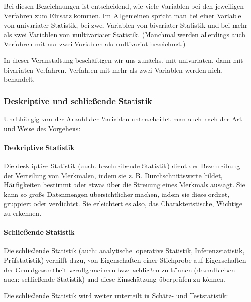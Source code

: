 \documentclass[
  11pt,
  ngerman,
  a4paper,
]{report}
\begin{document}
Bei diesen Bezeichnungen ist entscheidend, wie viele Variablen bei den jeweiligen Verfahren zum Einsatz kommen. Im Allgemeinen spricht man bei einer Variable von univariater Statistik, bei zwei Variablen von bivariater Statistik und bei mehr als zwei Variablen von multivariater Statistik. (Manchmal werden allerdings auch Verfahren mit nur zwei Variablen als multivariat bezeichnet.)

In dieser Veranstaltung beschäftigen wir uns zunächst mit univariaten, dann mit bivariaten Verfahren. Verfahren mit mehr als zwei Variablen werden nicht behandelt.

\hypertarget{deskriptive-und-schlieuxdfende-statistik}{%
\subsubsection{Deskriptive und schließende Statistik}\label{deskriptive-und-schlieuxdfende-statistik}}

Unabhängig von der Anzahl der Variablen unterscheidet man auch nach der Art und Weise des Vorgehens:

\hypertarget{deskriptive-statistik}{%
\paragraph{Deskriptive Statistik}\label{deskriptive-statistik}}

Die deskriptive Statistik (auch: beschreibende Statistik) dient der Beschreibung der Verteilung von Merkmalen, indem sie z. B. Durchschnittswerte bildet, Häufigkeiten bestimmt oder etwas über die Streuung eines Merkmals aussagt. Sie kann so große Datenmengen übersichtlicher machen, indem sie diese ordnet, gruppiert oder verdichtet. Sie erleichtert es also, das Charakteristische, Wichtige zu erkennen.

\hypertarget{schlieuxdfende-statistik}{%
\paragraph{Schließende Statistik}\label{schlieuxdfende-statistik}}

Die schließende Statistik (auch: analytische, operative Statistik, Inferenzstatistik, Prüfstatistik) verhilft dazu, von Eigenschaften einer Stichprobe auf Eigenschaften der Grundgesamtheit verallgemeinern bzw. schließen zu können (deshalb eben auch: schließende Statistik) und diese Einschätzung überprüfen zu können.

Die schließende Statistik wird weiter unterteilt in Schätz- und Teststatistik:
\end{document}
